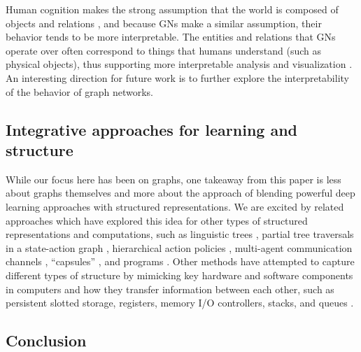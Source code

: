 Human cognition makes the strong assumption that the world is composed of objects and relations \citep{spelke2007core}, and because GNs make a similar assumption, their behavior tends to be more interpretable.
The entities and relations that GNs operate over often correspond to things that humans understand (such as physical objects), thus supporting more interpretable analysis and visualization \citep[e.g., as in][]{selsam2018learning}.
An interesting direction for future work is to further explore the interpretability of the behavior of graph networks.

\subsection{Integrative approaches for learning and structure}

While our focus here has been on graphs, one takeaway from this paper is less about graphs themselves and more about the approach of blending powerful deep learning approaches with structured representations.
We are excited by related approaches which have explored this idea for other types of structured representations and computations, such as linguistic trees \citep{socher2011parsing,socher2011semi,socher2012semantic,socher2013recursive,tai2015improved,andreas2016neural}, partial tree traversals in a state-action graph \citep{guez2018learning,farquhar2017treeqn}, hierarchical action policies \citep{andreas2016modular}, multi-agent communication channels \citep{foerster2016learning}, ``capsules'' \citep{sabour2017dynamic}, and programs \citep{parisotto2016neuro}.
Other methods have attempted to capture different types of structure by mimicking key hardware and software components in computers and how they transfer information between each other, such as persistent slotted storage, registers, memory I/O controllers, stacks, and queues \citep[e.g.][]{dyer2015transition,grefenstette2015learning,joulin2015inferring,sukhbaatar2015end,kurach2015neural,graves2016hybrid}.

\subsection{Conclusion}

